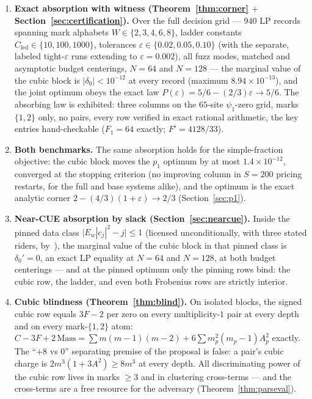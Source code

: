 \documentclass[11pt]{article}
\theoremstyle{plain}
\theoremstyle{definition}
\theoremstyle{remark}
\newcommand{\Cled}{C_{\mathrm{led}}}
\begin{document}
\begin{enumerate}
\item \textbf{Exact absorption with witness (Theorem~\ref{thm:corner} $+$
Section~\ref{sec:certification}).} Over the full decision grid ---
$940$ LP records spanning mark alphabets $W \in \{2, 3, 4, 6, 8\}$, ladder
constants $\Cled \in \{10, 100, 1000\}$, tolerances
$\varepsilon \in \{0.02, 0.05, 0.10\}$ (with the separate, labeled
tight-$\varepsilon$
runs extending to $\varepsilon = 0.002$), all fuzz modes, matched and asymptotic
budget centerings, $N = 64$ and $N = 128$ --- the marginal value of the cubic
block is $|\delta_0| < 10^{-12}$ at every record (maximum
$8.94 \times 10^{-13}$), and the joint optimum obeys the exact law
$P(\varepsilon) = 5/6 - (2/3)\varepsilon \to 5/6$. The absorbing law is
exhibited: three columns on the $65$-site $\psi_1$-zero grid, marks $\{1, 2\}$
only, no pairs, every row verified in exact rational arithmetic, the key entries
hand-checkable ($F_1 = 64$ exactly; $F' = 4128/33$).

\item \textbf{Both benchmarks.} The same absorption holds for the
simple-fraction objective: the cubic block moves the $p_1$ optimum by at most
$1.4 \times 10^{-12}$, converged at the stopping criterion (no improving
column in $S = 200$ pricing restarts, for the full and base systems alike), and
the
optimum is the exact analytic corner
$2 - (4/3)(1 + \varepsilon) \to 2/3$ (Section~\ref{sec:p1}).

\item \textbf{Near-CUE absorption by slack
(Section~\ref{sec:nearcue}).} Inside the pinned data class
$\bigl| E_w |c_j|^2 - j \bigr| \le 1$ (licensed unconditionally, with three
stated riders, by~\cite{BGSTB24}), the marginal value of the cubic block in that
pinned class is $\delta_0' = 0$, an exact LP equality at
$N = 64$ and $N = 128$, at both budget centerings --- and at the pinned optimum
only the pinning rows bind: the cubic row, the ladder, and even both Frobenius
rows are strictly interior.

\item \textbf{Cubic blindness (Theorem~\ref{thm:blind}).} On isolated blocks,
the signed cubic row equals $3F - 2$ per zero on every multiplicity-$1$ pair at
every depth and on every mark-$\{1, 2\}$ atom:
$C - 3F + 2\,\mathrm{Mass} = \sum m(m-1)(m-2) + 6 \sum m_p^2 (m_p - 1) A_p^2$
exactly. The ``$+8$ vs $0$'' separating premise of the proposal is
false: a pair's cubic charge is
$2m^3(1 + 3A^2) \ge 8m^3$ at every depth. All discriminating power of the cubic
row lives in marks $\ge 3$ and in clustering cross-terms --- and the cross-terms
are a free resource for the adversary (Theorem~\ref{thm:parseval}).


\end{enumerate}
\end{document}
